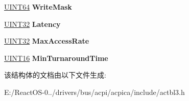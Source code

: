 \begin{DoxyCompactItemize}
\hyperlink{_processor_bind_8h_a57be03562867144161c1bfee95ca8f7c}{U\+I\+N\+T64} {\bfseries Write\+Mask}
\item 
\mbox{\label{structacpi__pcct__subspace_ac2375b559f161f4e5f4eb792f9ae190f}} 
\hyperlink{_processor_bind_8h_ae1e6edbbc26d6fbc71a90190d0266018}{U\+I\+N\+T32} {\bfseries Latency}
\item 
\mbox{\label{structacpi__pcct__subspace_a4b5c060c1c052fe540ec381a4c0e19fb}} 
\hyperlink{_processor_bind_8h_ae1e6edbbc26d6fbc71a90190d0266018}{U\+I\+N\+T32} {\bfseries Max\+Access\+Rate}
\item 
\mbox{\label{structacpi__pcct__subspace_a663d864d5cc4ed3b42fd32493d71f7ef}} 
\hyperlink{_processor_bind_8h_a09f1a1fb2293e33483cc8d44aefb1eb1}{U\+I\+N\+T16} {\bfseries Min\+Turnaround\+Time}
\end{DoxyCompactItemize}


该结构体的文档由以下文件生成\+:\begin{DoxyCompactItemize}
\item 
E\+:/\+React\+O\+S-\/0../drivers/bus/acpi/acpica/include/actbl3.\+h\end{DoxyCompactItemize}
